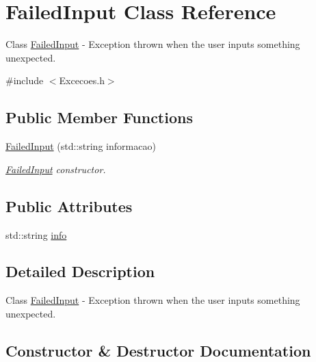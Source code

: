 \hypertarget{class_failed_input}{}\section{Failed\+Input Class Reference}
\label{class_failed_input}


Class \hyperlink{class_failed_input}{Failed\+Input} -\/ Exception thrown when the user inputs something unexpected.  




{\ttfamily \#include $<$Excecoes.\+h$>$}

\subsection*{Public Member Functions}
\begin{DoxyCompactItemize}
\item 
\hyperlink{class_failed_input_abc8e47cd31f5658b4bff220aa8da8960}{Failed\+Input} (std\+::string informacao)
\begin{DoxyCompactList}\small\item\em \hyperlink{class_failed_input}{Failed\+Input} constructor. \end{DoxyCompactList}\end{DoxyCompactItemize}
\subsection*{Public Attributes}
\begin{DoxyCompactItemize}
\item 
std\+::string \hyperlink{class_failed_input_abbd3a2cf711623b8f97f05f7168cfd38}{info}
\end{DoxyCompactItemize}


\subsection{Detailed Description}
Class \hyperlink{class_failed_input}{Failed\+Input} -\/ Exception thrown when the user inputs something unexpected. 

\subsection{Constructor \& Destructor Documentation}
\mbox{\label{class_failed_input_abc8e47cd31f5658b4bff220aa8da8960}} 
